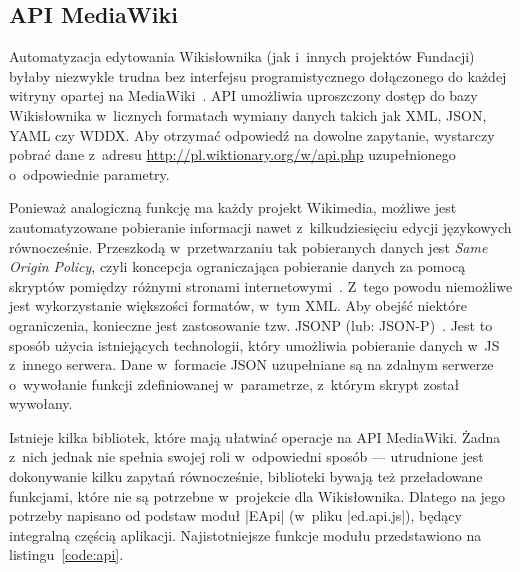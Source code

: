 \subsection{API MediaWiki}
Automatyzacja edytowania Wikisłownika (jak i~innych projektów Fundacji) byłaby niezwykle trudna bez interfejsu programistycznego dołączonego do każdej witryny opartej na MediaWiki~\cite{mw:api}. API umożliwia uproszczony dostęp do bazy Wikisłownika w~licznych formatach wymiany danych takich jak XML, JSON, YAML czy WDDX. Aby otrzymać odpowiedź na dowolne zapytanie, wystarczy pobrać dane z~adresu \url{http://pl.wiktionary.org/w/api.php} uzupełnionego o~odpowiednie parametry.

Ponieważ analogiczną funkcję ma każdy projekt Wikimedia, możliwe jest zautomatyzowane pobieranie informacji nawet z~kilkudziesięciu edycji językowych równocześnie. Przeszkodą w~przetwarzaniu tak pobieranych danych jest \emph{Same Origin Policy}, czyli koncepcja ograniczająca pobieranie danych za pomocą skryptów pomiędzy różnymi stronami internetowymi~\cite{mozilla:sop}. Z~tego powodu niemożliwe jest wykorzystanie większości formatów, w~tym XML. Aby obejść niektóre ograniczenia, konieczne jest zastosowanie tzw. JSONP (lub: \hbox{JSON-P})~\cite{jsonp}. Jest to sposób użycia istniejących technologii, który umożliwia pobieranie danych w~JS z~innego serwera. Dane w~formacie JSON uzupełniane są na zdalnym serwerze o~wywołanie funkcji zdefiniowanej w~parametrze, z~którym skrypt został wywołany.

Istnieje kilka bibliotek, które mają ułatwiać operacje na API MediaWiki. Żadna z~nich jednak nie spełnia swojej roli w~odpowiedni sposób --- utrudnione jest dokonywanie kilku zapytań równocześnie, biblioteki bywają też przeładowane funkcjami, które nie są potrzebne w~projekcie dla Wikisłownika. Dlatego na jego potrzeby napisano od podstaw moduł \kod|EApi| (w~pliku \kod|ed.api.js|), będący integralną częścią aplikacji. Najistotniejsze funkcje modułu przedstawiono na listingu~\ref{code:api}.

